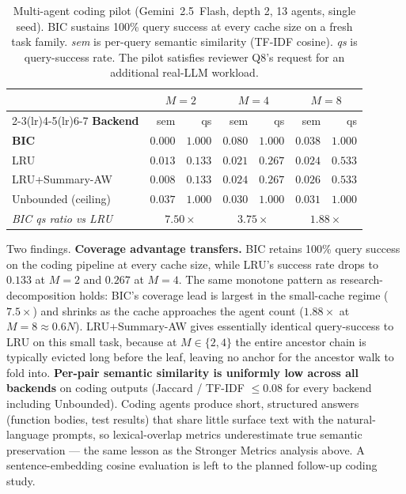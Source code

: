 \documentclass[fleqn,10pt]{article}
\theoremstyle{definition}
\newcommand{\slots}{M}
\begin{document}
\begin{table}[t]
\centering
\caption{Multi-agent coding pilot (Gemini~2.5~Flash, depth 2,
13 agents, single seed). BIC sustains 100\% query success at every
cache size on a fresh task family. \emph{sem} is per-query semantic
similarity (TF-IDF cosine). \emph{qs} is query-success rate. The
pilot satisfies reviewer Q8's request for an additional real-LLM
workload.}
\label{tab:coding_pilot}
\small
\setlength{\tabcolsep}{4pt}
\begin{tabular}{lrrrrrr}
\toprule
 & \multicolumn{2}{c}{\textbf{$\slots = 2$}}
 & \multicolumn{2}{c}{\textbf{$\slots = 4$}}
 & \multicolumn{2}{c}{\textbf{$\slots = 8$}} \\
\cmidrule(lr){2-3}\cmidrule(lr){4-5}\cmidrule(lr){6-7}
\textbf{Backend} & sem & qs & sem & qs & sem & qs \\
\midrule
\textbf{BIC}              & $0.000$ & $\mathbf{1.000}$ & $\mathbf{0.080}$ & $\mathbf{1.000}$ & $\mathbf{0.038}$ & $\mathbf{1.000}$ \\
LRU                       & $0.013$ & $0.133$          & $0.021$          & $0.267$          & $0.024$          & $0.533$ \\
LRU+Summary-AW            & $0.008$ & $0.133$          & $0.024$          & $0.267$          & $0.026$          & $0.533$ \\
Unbounded (ceiling)       & $0.037$ & $1.000$          & $0.030$          & $1.000$          & $0.031$          & $1.000$ \\
\midrule
\textit{BIC qs ratio vs LRU} & \multicolumn{2}{c}{$7.50\times$} & \multicolumn{2}{c}{$3.75\times$} & \multicolumn{2}{c}{$1.88\times$} \\
\bottomrule
\end{tabular}
\end{table}

Two findings.
\textbf{Coverage advantage transfers.} BIC retains 100\% query
success on the coding pipeline at every cache size, while LRU's
success rate drops to $0.133$ at $\slots = 2$ and $0.267$ at
$\slots = 4$. The same monotone pattern as research-decomposition
holds: BIC's coverage lead is largest in the small-cache regime
($7.5\times$) and shrinks as the cache approaches the agent count
($1.88\times$ at $\slots = 8 \approx 0.6 N$). LRU+Summary-AW gives
essentially identical query-success to LRU on this small task,
because at $\slots \in \{2, 4\}$ the entire ancestor chain is
typically evicted long before the leaf, leaving no anchor for the
ancestor walk to fold into.
\textbf{Per-pair semantic similarity is uniformly low across all
backends} on coding outputs (Jaccard / TF-IDF $\leq 0.08$ for every
backend including Unbounded). Coding agents produce short,
structured answers (function bodies, test results) that share
little surface text with the natural-language prompts, so
lexical-overlap metrics underestimate true semantic preservation
--- the same lesson as the Stronger Metrics analysis above. A
sentence-embedding cosine evaluation is left to the planned
follow-up coding study.
\end{document}
